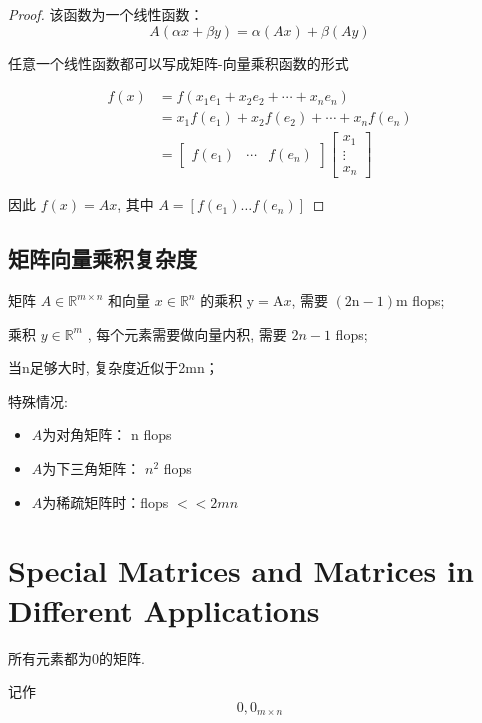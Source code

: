 \begin{proof}
    该函数为一个线性函数： $$ A(\alpha x+\beta y)=\alpha(A x)+\beta(A y) $$ 
    
    任意一个线性函数都可以写成矩阵-向量乘积函数的形式

    $$ \begin{aligned} f(x) &=f\left(x_{1} e_{1}+x_{2} e_{2}+\cdots+x_{n} e_{n}\right) \\ &=x_{1} f\left(e_{1}\right)+x_{2} f\left(e_{2}\right)+\cdots+x_{n} f\left(e_{n}\right) \\ &=\left[\begin{array}{lll}f\left(e_{1}\right) & \cdots & f\left(e_{n}\right)\end{array}\right]\left[\begin{array}{c}x_{1} \\ \vdots \\ x_{n}\end{array}\right] \end{aligned} $$

    因此 $ f(x)=A x $, 其中 $ A=\left[f\left(e_{1}\right) \ldots f\left(e_{n}\right)\right] $
\end{proof}

\subsection{矩阵向量乘积复杂度}

矩阵 $ A \in \mathbb{R}^{m \times n} $ 和向量 $ x \in \mathbb{R}^{n} $ 的乘积 $ \mathrm{y}=\mathrm{A} x $, 需要 $ (2 \mathrm{n}-1) \mathrm{m} $ flops;

乘积 $ y \in \mathbb{R}^{m} $ , 每个元素需要做向量内积, 需要 $ 2 n-1 $ flops;

当n足够大时, 复杂度近似于2mn；

特殊情况:

\begin{itemize}
    \item $A$为对角矩阵： $ \mathrm{n} $ flops
    \item $A$为下三角矩阵： $ n^{2} $ flops
    \item $A$为稀疏矩阵时：flops $ <<2 m n $
\end{itemize}


\section{Special Matrices and Matrices in Different Applications}

\begin{definition}
    所有元素都为0的矩阵.

    记作$$0, 0_{m \times n} $$
\end{definition}

